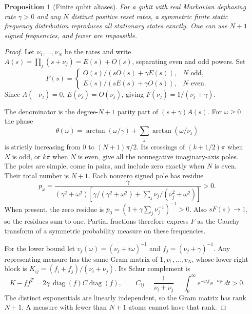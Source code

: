 \documentclass[11pt,a4paper]{article}
\newtheorem{proposition}[theorem]{Proposition}
\newcommand{\diag}{\operatorname{diag}}
\begin{document}
\begin{proposition}[Finite qubit aliases]\label{prop:qubit}
For a qubit with real Markovian dephasing rate $\gamma>0$ and any
$N$ distinct positive reset rates, a symmetric finite static frequency
distribution reproduces all stationary states exactly. One can use
$N+1$ signed frequencies, and fewer are impossible.
\end{proposition}
\begin{proof}
Let $\nu_1,\ldots,\nu_N$ be the rates and write
$A(s)=\prod_j(s+\nu_j)=E(s)+O(s)$, separating even and odd powers.
Set
\begin{equation}\label{eq:qubitF}
 F(s)=
 \begin{cases}
 O(s)/(sO(s)+\gamma E(s)),&N\text{ odd},\\
 E(s)/(sE(s)+\gamma O(s)),&N\text{ even}.
 \end{cases}
\end{equation}
Since $A(-\nu_j)=0$, $E(\nu_j)=O(\nu_j)$, giving
$F(\nu_j)=1/(\nu_j+\gamma)$.

The denominator is the degree-$N+1$ parity part of
$(s+\gamma)A(s)$. For $\omega\geq0$ the phase
\[
 \theta(\omega)=\arctan(\omega/\gamma)
                  +\sum_j\arctan(\omega/\nu_j)
\]
is strictly increasing from $0$ to $(N+1)\pi/2$. Its crossings of
$(k+1/2)\pi$ when $N$ is odd, or $k\pi$ when $N$ is even,
give all the nonnegative imaginary-axis poles. The poles are simple,
come in pairs, and include zero exactly when $N$ is even. Their total
number is $N+1$. Each nonzero signed pole has residue
\begin{equation}\label{eq:mass}
 p_\omega=\frac{\gamma}{(\gamma^2+\omega^2)
 [\gamma/(\gamma^2+\omega^2)+\sum_j\nu_j/(\nu_j^2+\omega^2)]}>0.
\end{equation}
When present, the zero residue is
$p_0=(1+\gamma\sum_j\nu_j^{-1})^{-1}>0$.
Also $sF(s)\to1$, so the residues sum to one. Partial fractions
therefore express $F$ as the Cauchy transform of a symmetric
probability measure on these frequencies.

For the lower bound let $v_j(\omega)=(\nu_j+i\omega)^{-1}$ and
$f_j=(\nu_j+\gamma)^{-1}$. Any representing measure has the same
Gram matrix of $1,v_1,\ldots,v_N$, whose lower-right block is
$K_{ij}=(f_i+f_j)/(\nu_i+\nu_j)$. Its Schur complement is
\[
 K-ff^T=2\gamma\,\diag(f)C\diag(f),\qquad
 C_{ij}=\frac1{\nu_i+\nu_j}
       =\int_0^\infty e^{-\nu_i t}e^{-\nu_j t}\,dt>0.
\]
The distinct exponentials are linearly independent, so the Gram
matrix has rank $N+1$. A measure with fewer than $N+1$ atoms
cannot have that rank.
\end{proof}
\end{document}
